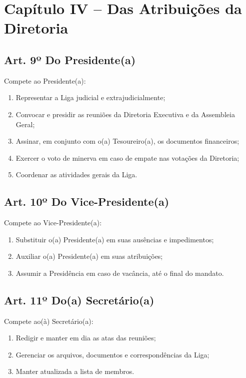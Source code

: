 \documentclass[12pt, a4paper]{article}
\begin{document}
\section{Capítulo IV – Das Atribuições da Diretoria}


\subsection{Art. 9º Do Presidente(a)}
Compete ao Presidente(a):
\begin{enumerate}[label=\alph*)]
    \item Representar a Liga judicial e extrajudicialmente;
    \item Convocar e presidir as reuniões da Diretoria Executiva e da Assembleia Geral;
    \item Assinar, em conjunto com o(a) Tesoureiro(a), os documentos financeiros;
    \item Exercer o voto de minerva em caso de empate nas votações da Diretoria;
    \item Coordenar as atividades gerais da Liga.
\end{enumerate}

\subsection{Art. 10º Do Vice-Presidente(a)}
Compete ao Vice-Presidente(a):
\begin{enumerate}[label=\alph*)]
    \item Substituir o(a) Presidente(a) em suas ausências e impedimentos;
    \item Auxiliar o(a) Presidente(a) em suas atribuições;
    \item Assumir a Presidência em caso de vacância, até o final do mandato.
\end{enumerate}

\subsection{Art. 11º Do(a) Secretário(a)}
Compete ao(à) Secretário(a):
\begin{enumerate}[label=\alph*)]
    \item Redigir e manter em dia as atas das reuniões;
    \item Gerenciar os arquivos, documentos e correspondências da Liga;
    \item Manter atualizada a lista de membros.
\end{enumerate}
\end{document}

